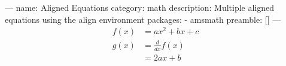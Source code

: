 ---
name: Aligned Equations
category: math
description: Multiple aligned equations using the align environment
packages:
  - amsmath
preamble: []
---
\begin{align}
  f(x) &= ax^2 + bx + c \\
  g(x) &= \frac{d}{dx} f(x) \\
       &= 2ax + b
\end{align}
